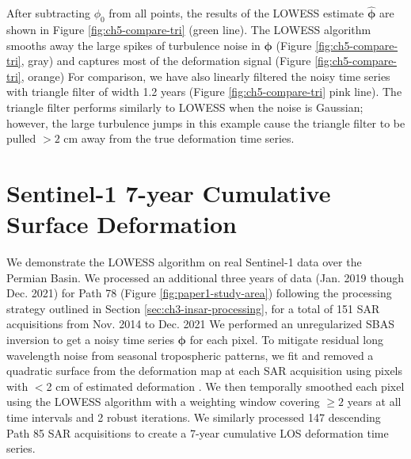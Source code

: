 After subtracting $ \phi_0 $ from all points, the results of the LOWESS estimate $ \bm{\hat{\phi}} $ are shown in Figure \ref{fig:ch5-compare-tri} (green line). The LOWESS algorithm smooths away the large spikes of turbulence noise in  $ \bm{\phi} $ (Figure \ref{fig:ch5-compare-tri}, gray) and captures most of the deformation signal (Figure \ref{fig:ch5-compare-tri}, orange)
For comparison, we have also linearly filtered the noisy time series with triangle filter of width 1.2 years (Figure \ref{fig:ch5-compare-tri} pink line). 
The triangle filter performs similarly to LOWESS when the noise is Gaussian; however, the large turbulence jumps in this example cause the triangle filter to be pulled $>2$ cm away from the true deformation time series.





\section{Sentinel-1 7-year Cumulative Surface Deformation}

We demonstrate the LOWESS algorithm on real Sentinel-1 data over the Permian Basin.
We processed an additional three years of data (Jan. 2019 though Dec. 2021) for Path 78 (Figure \ref{fig:paper1-study-area}) following the processing strategy outlined in Section \ref{sec:ch3-insar-processing}, for a total of 151 SAR acquisitions from Nov. 2014 to Dec. 2021
We performed an unregularized SBAS inversion to get a noisy time series $ \bm{\phi} $ for each pixel. 
To mitigate residual long wavelength noise from seasonal tropospheric patterns, we fit and removed a quadratic surface from the deformation map at each SAR acquisition using pixels with $<$2 cm of estimated deformation \citep{Morishita2020LicsbasOpenSource}. We then temporally smoothed each pixel using the LOWESS algorithm with a weighting window covering $\geq 2$ years at all time intervals and 2 robust iterations. We similarly processed 147 descending Path 85 SAR acquisitions to create a 7-year cumulative LOS deformation time series.

